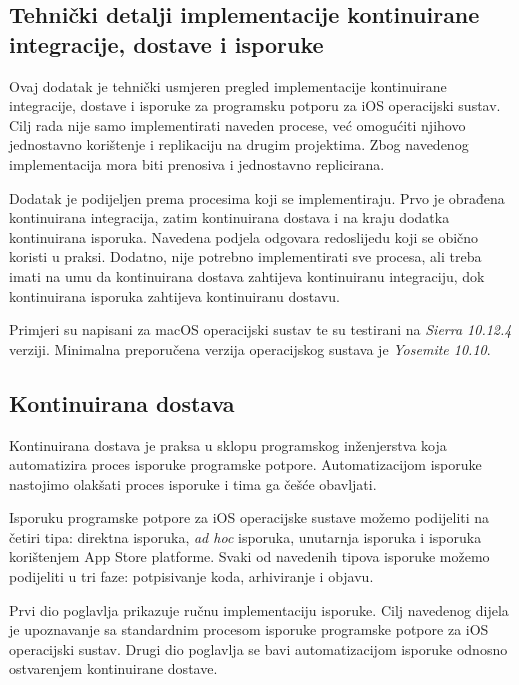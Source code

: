 \documentclass[times, utf8, diplomski, numeric]{fer}
\begin{document}
\begin{appendices}



\chapter{Tehnički detalji implementacije kontinuirane integracije, dostave i isporuke}

Ovaj dodatak je tehnički usmjeren pregled implementacije kontinuirane integracije, dostave i isporuke za programsku potporu za iOS operacijski sustav. Cilj rada nije samo implementirati naveden procese, već omogućiti njihovo jednostavno korištenje i replikaciju na drugim projektima. Zbog navedenog implementacija mora biti prenosiva i jednostavno replicirana.

Dodatak je podijeljen prema procesima koji se implementiraju. Prvo je obrađena kontinuirana integracija, zatim kontinuirana dostava i na kraju dodatka kontinuirana isporuka. Navedena podjela odgovara redoslijedu koji se obično koristi u praksi. Dodatno, nije potrebno implementirati sve procesa, ali treba imati na umu da kontinuirana dostava zahtijeva kontinuiranu integraciju, dok kontinuirana isporuka zahtijeva kontinuiranu dostavu.

Primjeri su napisani za macOS operacijski sustav te su testirani na \textit{Sierra 10.12.4} verziji. Minimalna preporučena verzija operacijskog sustava je \textit{Yosemite 10.10}.


\section{Kontinuirana dostava}

Kontinuirana dostava je praksa u sklopu programskog inženjerstva koja automatizira proces isporuke programske potpore. Automatizacijom isporuke nastojimo olakšati proces isporuke i tima ga češće obavljati.

Isporuku programske potpore za iOS operacijske sustave možemo podijeliti na četiri tipa: direktna isporuka, \textit{ad hoc} isporuka, unutarnja isporuka i isporuka korištenjem App Store platforme. Svaki od navedenih tipova isporuke možemo podijeliti u tri faze: potpisivanje koda, arhiviranje i objavu.

Prvi dio poglavlja prikazuje ručnu implementaciju isporuke. Cilj navedenog dijela je upoznavanje sa standardnim procesom isporuke programske potpore za iOS operacijski sustav. Drugi dio poglavlja se bavi automatizacijom isporuke odnosno ostvarenjem kontinuirane dostave.


\end{appendices}
\end{document}
